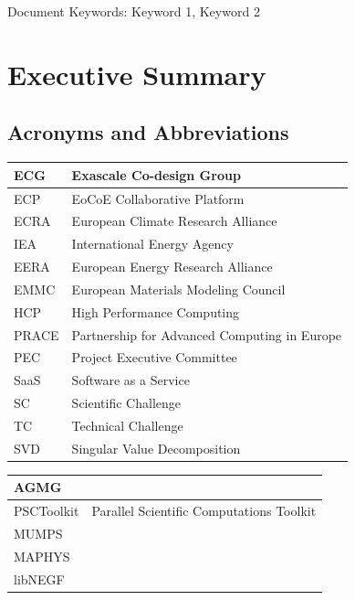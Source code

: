 \documentclass[a4paper,12pt]{article}
\begin{document}
\par\noindent Document  Keywords: Keyword 1,  Keyword 2

\clearpage
\tableofcontents
\clearpage
\section*{Executive Summary}

\subsection*{Acronyms and Abbreviations}
\begin{flushleft}
  \begin{tabular}{|p{}|p{}|}
    \hline
    ECG & Exascale Co-design Group \\ \hline
    ECP & EoCoE Collaborative Platform \\ \hline 
    ECRA & European Climate Research Alliance \\ \hline 
    IEA & International Energy Agency \\ \hline 
    EERA & European Energy Research Alliance \\ \hline 
    EMMC & European Materials Modeling Council \\ \hline 
    HCP & High Performance Computing \\ \hline 
    PRACE & Partnership for Advanced Computing in Europe \\ \hline 
    PEC & Project Executive Committee \\ \hline 
    SaaS & Software as a Service \\ \hline 
    SC & Scientific Challenge \\ \hline 
    TC & Technical Challenge \\ \hline
    SVD & Singular Value Decomposition \\ \hline
  \end{tabular}
\end{flushleft}
\begin{flushleft}
  \begin{tabular}{|p{}|p{}|}
    \hline
    AGMG  &   \\\hline 
    PSCToolkit  &  Parallel Scientific Computations Toolkit  \\\hline 
    MUMPS   &    \\\hline 
    MAPHYS  &  \\\hline
    libNEGF & \\ \hline
    \end{tabular}
\end{flushleft}
\clearpage
\end{document}
